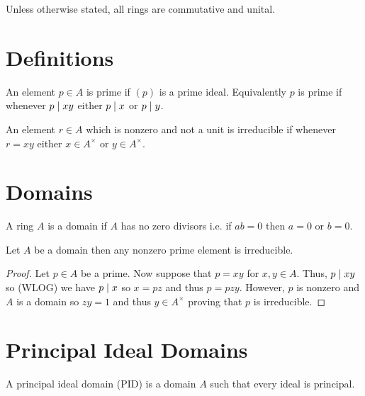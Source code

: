 \documentclass[12pt]{article}
\begin{document}
\begin{remark}
Unless otherwise stated, all rings are commutative and unital.
\end{remark}

\section{Definitions}

\begin{definition}
An element $p \in A$ is prime if $(p)$ is a prime ideal. Equivalently $p$ is prime if whenever $p \mid xy$ either $p \mid x$ or $p \mid y$.
\end{definition}

\begin{definition}
An element $r \in A$ which is nonzero and not a unit is irreducible if whenever $r = xy$ either $x \in A^\times$ or $y \in A^\times$. 
\end{definition}

\section{Domains}

\begin{definition}
A ring $A$ is a domain if $A$ has no zero divisors i.e. if $ab = 0$ then $a = 0$ or $b = 0$.
\end{definition}

\begin{proposition}
Let $A$ be a domain then any nonzero prime element is irreducible. 
\end{proposition}

\begin{proof}
Let $p \in A$ be a prime. Now suppose that $p = xy$ for $x,y \in A$. Thus, $p \mid xy$ so (WLOG) we have $p \mid x$ so $x = pz$ and thus $p = pzy$. However, $p$ is nonzero and $A$ is a domain so $zy = 1$ and thus $y \in A^\times$ proving that $p$ is irreducible. 
\end{proof}

\section{Principal Ideal Domains}

\begin{definition}
A principal ideal domain (PID) is a domain $A$ such that every ideal is principal. 
\end{definition}
\end{document}
